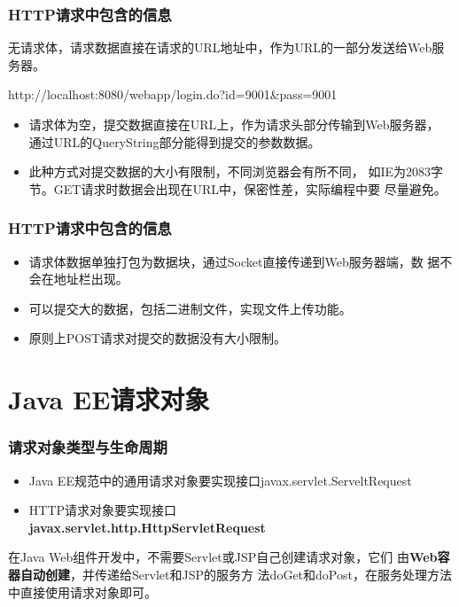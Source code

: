 \begin{frame} %
  \frametitle{HTTP请求中包含的信息} 


  无请求体，请求数据直接在请求的URL地址中，作为URL的一部分发送给Web服务器。
  
  \begin{xmlCode}
    http://localhost:8080/webapp/login.do?id=9001&pass=9001
  \end{xmlCode}

  \pause
  
  \begin{itemize}
  \item 请求体为空，提交数据直接在URL上，作为请求头部分传输到Web服务器，
    通过URL的QueryString部分能得到提交的参数数据。
  \item 此种方式对提交数据的大小有限制，不同浏览器会有所不同，
    如IE为2083字节。GET请求时数据会出现在URL中，保密性差，实际编程中要
    尽量避免。
  \end{itemize}

\end{frame}

\begin{frame} %
  \frametitle{HTTP请求中包含的信息} 


  \begin{itemize}
  \item 请求体数据单独打包为数据块，通过Socket直接传递到Web服务器端，数
    据不会在地址栏出现。
  \item 可以提交大的数据，包括二进制文件，实现文件上传功能。
  \item 原则上POST请求对提交的数据没有大小限制。
  \end{itemize}
\end{frame}

\section{Java EE请求对象}

\begin{frame}
  \frametitle{请求对象类型与生命周期} 
  \begin{itemize}
  \item Java EE规范中的通用请求对象要实现接口javax.servlet.ServeltRequest
  \item HTTP请求对象要实现接口\\{\bf\Red javax.servlet.http.HttpServletRequest}
  \end{itemize}


  在Java Web组件开发中，不需要Servlet或JSP自己创建请求对象，它们
  由{\bf\Blue Web容器自动创建}，并传递给Servlet和JSP的服务方
  法doGet和doPost，在服务处理方法中直接使用请求对象即可。
\end{frame}

